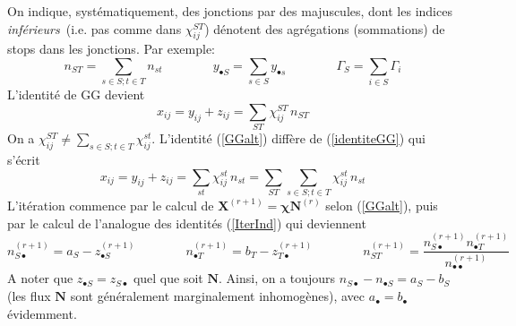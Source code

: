 \documentclass{article}
\theoremstyle{plain}
\begin{document}
On indique, systématiquement, des jonctions par des majuscules, dont les indices {\em inférieurs} (i.e. pas comme dans $ \chi_{ij}^{ST}$) dénotent des agrégations (sommations) de stops dans les jonctions. Par exemple: 
\begin{displaymath}
n_{ST}=\sum_{s\in S; t\in T}n_{st}\qquad\qquad y_{\bullet S}=\sum_{s\in S} y_{\bullet s}\qquad\qquad\Gamma_S=\sum_{i\in S}\Gamma_i
\end{displaymath}
L'identité de GG devient 
\begin{equation}
\label{GGalt}
x_{ij}=y_{ij}+z_{ij}=\sum_{ST}\chi_{ij}^{ST}\, n_{ST}
\end{equation}
On a 
 $ \chi_{ij}^{ST}\neq \sum_{s\in S; t\in T}\chi_{ij}^{st}$. L'identité (\ref{GGalt}) diffère de (\ref{identiteGG}) qui s'écrit
\begin{displaymath}
x_{ij}=y_{ij}+z_{ij}=\sum_{st}\chi_{ij}^{st}\, n_{st}=\sum_{ST}\sum_{s\in S; t\in T}\chi_{ij}^{st}\, n_{st}
\end{displaymath}
L'itération commence par le calcul de $\mathbf{X}^{(r+1)}=\bm{\chi}\mathbf{N}^{(r)}$ selon  (\ref{GGalt}), puis par le calcul de l'analogue des identités (\ref{IterInd}) qui deviennent 
\begin{equation}
\label{IterIndAlt}
n_{S\bullet}^{(r+1)}=a_S-z_{\bullet S}^{(r+1)}
\qquad\qquad
n_{\bullet T}^{(r+1)}=b_T-z_{T\bullet}^{(r+1)}
\qquad\qquad
n_{ST}^{(r+1)}=\frac{n^{(r+1)}_{S\bullet}n^{(r+1)}_{\bullet T}}{n^{(r+1)}_{\bullet\bullet}}
\end{equation}
A noter que $z_{\bullet S}=z_{S\bullet}$ quel que soit $\mathbf{N}$. Ainsi, on a toujours $n_{S\bullet}-n_{\bullet S}=a_S-b_S$ (les flux  $\mathbf{N}$ sont généralement marginalement inhomogènes), avec $a_{\bullet}=b_{\bullet}$ évidemment. 
\end{document}

